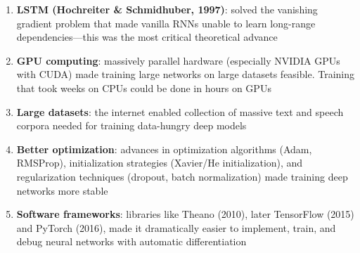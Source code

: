 \documentclass[11pt,a4paper]{article}
\begin{document}
\begin{enumerate}[leftmargin=1.5em]
    \item \textbf{LSTM (Hochreiter \& Schmidhuber, 1997)}: solved the vanishing gradient problem that made vanilla RNNs unable to learn long-range dependencies---this was the most critical theoretical advance
    \item \textbf{GPU computing}: massively parallel hardware (especially NVIDIA GPUs with CUDA) made training large networks on large datasets feasible. Training that took weeks on CPUs could be done in hours on GPUs
    \item \textbf{Large datasets}: the internet enabled collection of massive text and speech corpora needed for training data-hungry deep models
    \item \textbf{Better optimization}: advances in optimization algorithms (Adam, RMSProp), initialization strategies (Xavier/He initialization), and regularization techniques (dropout, batch normalization) made training deep networks more stable
    \item \textbf{Software frameworks}: libraries like Theano (2010), later TensorFlow (2015) and PyTorch (2016), made it dramatically easier to implement, train, and debug neural networks with automatic differentiation
\end{enumerate}
\end{document}
